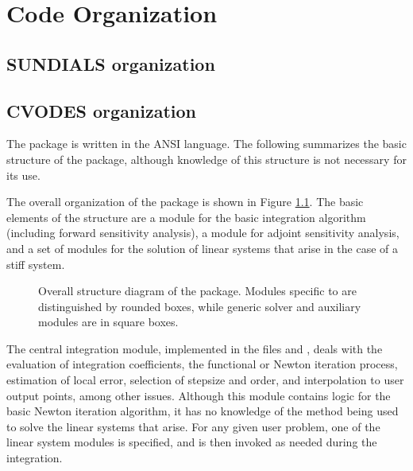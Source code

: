 \chapter{Code Organization}\label{s:organization}

\section{SUNDIALS organization}\label{ss:sun_org}


\section{CVODES organization}\label{ss:cvodes_org}

The {\cvodes} package is written in the ANSI {\C} language. The following
summarizes the basic structure of the package, although knowledge
of this structure is not necessary for its use.

The overall organization of the {\cvodes} package is shown in Figure
\ref{f:cvsorg}.  The basic elements of the structure are a module for
the basic integration algorithm (including forward sensitivity analysis),
a module for adjoint sensitivity analysis, and a set of modules for the solution
of linear systems that arise in the case of a stiff system.  
\begin{figure}
{\centerline{}}
\caption [Overall structure diagram of the {\cvodes} package]
{Overall structure diagram of the {\cvodes} package.
  Modules specific to {\cvodes} are distinguished by rounded boxes, while 
  generic solver and auxiliary modules are in square boxes.}
\label{f:cvsorg}
\end{figure}

The central integration module, implemented in the files 
 and , deals with the evaluation of integration coefficients,
the functional or Newton iteration process, estimation of local error,
selection of stepsize and order, and interpolation to user output
points, among other issues.  Although this module contains logic for
the basic Newton iteration algorithm, it has no knowledge of the
method being used to solve the linear systems that arise.  For any
given user problem, one of the linear system modules is specified, and
is then invoked as needed during the integration. 

